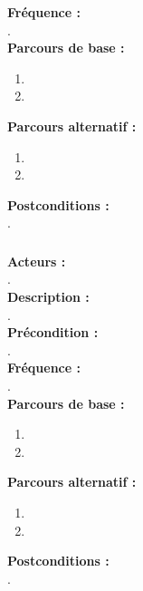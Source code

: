 \documentclass[../rapport.tex]{subfiles}
\begin{document}
\textbf{Fréquence :} \\
. \\

\textbf{Parcours de base :} \\
\begin{enumerate}
    \item 
    \item 
\end{enumerate}
\bigskip

\textbf{Parcours alternatif :}
\begin{enumerate}
    \item 
    \item 
\end{enumerate}

\textbf{Postconditions :} \\
. \\



\subsubsection{}

\textbf{Acteurs :} \\
. \\

\textbf{Description :} \\
. \\

\textbf{Précondition :} \\
. \\

\textbf{Fréquence :} \\
. \\

\textbf{Parcours de base :} \\
\begin{enumerate}
    \item 
    \item 
\end{enumerate}
\bigskip

\textbf{Parcours alternatif :}
\begin{enumerate}
    \item 
    \item 
\end{enumerate}

\textbf{Postconditions :} \\
. \\
\end{document}
